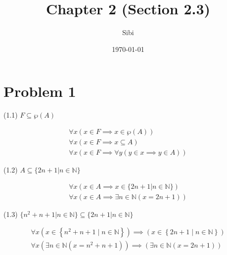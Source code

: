 \documentclass{article}
\begin{document}
\title{Chapter 2 (Section 2.3)}
\author{Sibi}
\date{\today}
\maketitle
\newpage

\section{Problem 1}

\begin{center}
(1.1) $F \subseteq \wp(A)$
\end{center}  
\begin{align*}
\forall x (x \in F \implies x \in \wp(A)) \\
\forall x (x \in F \implies x \subseteq A) \\
\forall x (x \in F \implies \forall y (y \in x \implies y \in A)) 
\end{align*}

\begin{center}
(1.2) $A \subseteq \{2n + 1 | n \in \mathbb{N}\}$ \\
\end{center}
\begin{align*}
\forall x (x \in A \implies x \in \{2n + 1 | n \in \mathbb{N}\}) \\
\forall x (x \in A \implies \exists n \in \mathbb{N} (x=2n+1))
\end{align*}

\begin{center}
(1.3) $\{n^2 + n + 1 | n \in \mathbb{N} \} \subseteq \{2n + 1 | n \in \mathbb{N} \}$ \\
\end{center}
\begin{align*}
\forall x (x \in \left\{n^2 + n + 1 \mid n \in \mathbb{N} \right\}) \implies (x \in \left\{2n + 1 \mid n \in \mathbb{N} \right\}) \\
\forall x (\exists n \in \mathbb{N} (x = n^2 + n + 1)) \implies (\exists n \in \mathbb{N} (x=2n+1)) \\
\end{align*}
\end{document}
